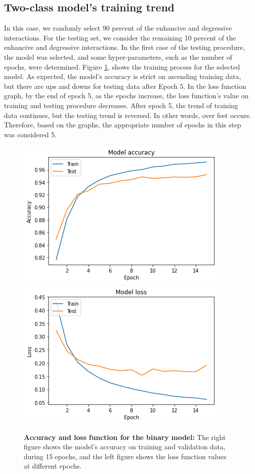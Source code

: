 \documentclass{bmcart}
\begin{document}
\subsection*{Two-class model's training trend}
In this case, we randomly select 90 percent of the enhancive and degressive interactions. For the testing set, we consider the remaining 10 percent of the enhancive and degressive interactions. In the first case of the testing procedure,  the model was selected, and some hyper-parameters, such as the number of epochs, were determined. Figure \ref{ModelSelection}, shows the training process for the selected model. As expected, the model's accuracy is strict on ascending training data, but there are ups and downs for testing data after Epoch 5. In the loss function graph, by the end of epoch 5, as the epochs increase, the loss function's value on training and testing procedure decreases. After epoch 5, the trend of training data continues, but the testing trend is reversed. In other words, over feet occurs. Therefore, based on the graphs, the appropriate number of epochs in this step was considered 5.
\begin{figure}[!h]
	\begin{minipage}{1\linewidth} 
		\includegraphics[width=.48\textwidth]{ModelSelection/selectedModelAcc.png} 
		\includegraphics[width=.48\textwidth]{ModelSelection/selectedModelLoss.png} 
	\end{minipage}
	\caption{\textbf{Accuracy and loss function for the binary model:} The right figure shows the model's accuracy on training and validation data, during 15 epochs, and the left figure shows the loss function values at different epochs.}
	\label{ModelSelection}
\end{figure}
\end{document}
